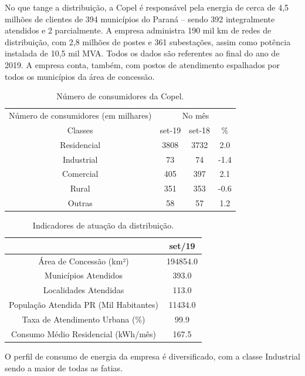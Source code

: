 \documentclass[grad,numbers]{coppe}
\begin{document}
  No que tange a distribuição, a Copel é responsável pela energia de cerca de 4,5 milhões de clientes de 394 municípios do Paraná -- sendo 392 integralmente atendidos e 2 parcialmente. A empresa administra 190 mil km de redes de distribuição, com 2,8 milhões de postes e 361 subestações, assim como potência instalada de 10,5 mil MVA. Todos os dados são referentes ao final do ano de 2019. A empresa conta, também, com postos de atendimento espalhados por todos os municípios da área de concessão.
  \begin{table}[H]

  \caption{\label{tab:unnamed-chunk-10}Número de consumidores da Copel.}
  \centering
  \begin{tabular}[t]{cccc}
  \toprule
  \multicolumn{1}{c}{Número de consumidores (em milhares)} & \multicolumn{3}{c}{No mês} \\
  \cmidrule(l{3pt}r{3pt}){1-1} \cmidrule(l{3pt}r{3pt}){2-4}
  Classes & set-19 & set-18 & \%\\
  \midrule
  Residencial & 3808 & 3732 & 2.0\\
  Industrial & 73 & 74 & -1.4\\
  Comercial & 405 & 397 & 2.1\\
  Rural & 351 & 353 & -0.6\\
  Outras & 58 & 57 & 1.2\\
  \bottomrule
  \end{tabular}
  \end{table}
  \begin{table}[H]

  \caption{\label{tab:unnamed-chunk-11}Indicadores de atuação da distribuição.}
  \centering
  \begin{tabular}[t]{cc}
  \toprule
    & set/19\\
  \midrule
  Área de Concessão (km²) & 194854.0\\
  Municípios Atendidos & 393.0\\
  Localidades Atendidas & 113.0\\
  População Atendida PR (Mil Habitantes) & 11434.0\\
  Taxa de Atendimento Urbana (\%) & 99.9\\
  \addlinespace
  Consumo Médio Residencial (kWh/mês) & 167.5\\
  \bottomrule
  \end{tabular}
  \end{table}
  O perfil de consumo de energia da empresa é diversificado, com a classe Industrial sendo a maior de todas as fatias.
\end{document}
